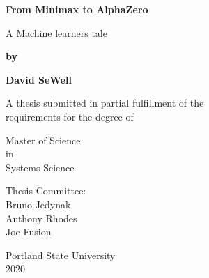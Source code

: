 
\begin{titlepage}
    \begin{center}
       
       \textbf{From Minimax to AlphaZero}
    
       \vspace{0.5cm}
        A Machine learners tale
            
       \vspace{2.5cm}
        
       \textbf{by}
       
       \textbf{David SeWell}
        
        \vspace{2.0cm}
        
       A thesis submitted in partial fulfillment of the \\
       requirements for the degree of
       
       \vspace{1.0cm}
       Master of Science\\
       in\\
       Systems Science
       
       \vspace{2.0cm}
        Thesis Committee:\\
        Bruno Jedynak\\
        Anthony Rhodes\\
        Joe Fusion\\
        
       \vspace{2.5cm}
    
       Portland State University\\
       2020
            
    \end{center}
\end{titlepage}
